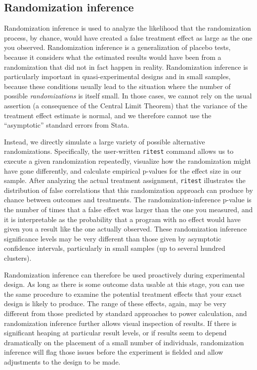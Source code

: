 \subsection{Randomization inference}

Randomization inference is used to analyze the likelihood
that the randomization process, by chance,
would have created a false treatment effect as large as the one you observed.
Randomization inference is a generalization of placebo tests,
because it considers what the estimated results would have been
from a randomization that did not in fact happen in reality.
Randomization inference is particularly important
in quasi-experimental designs and in small samples,
because these conditions usually lead to the situation
where the number of possible \textit{randomizations} is itself small.
In those cases, we cannot rely on the usual assertion
(a consequence of the Central Limit Theorem)
that the variance of the treatment effect estimate is normal,
and we therefore cannot use the ``asymptotic'' standard errors from Stata.

Instead, we directly simulate a large variety of possible alternative randomizations.
Specifically, the user-written \texttt{ritest} command
allows us to execute a given randomization repeatedly,
visualize how the randomization might have gone differently,
and calculate empirical p-values for the effect size in our sample.
After analyzing the actual treatment assignment,
\texttt{ritest} illustrates the distribution of false correlations
that this randomization approach can produce by chance
between outcomes and treatments.
The randomization-inference p-value is the number of times
that a false effect was larger than the one you measured,
and it is interpretable as the probability that a program with no effect
would have given you a result like the one actually observed.
These randomization inference
significance levels may be very different
than those given by asymptotic confidence intervals,
particularly in small samples (up to several hundred clusters).

Randomization inference can therefore be used proactively during experimental design.
As long as there is some outcome data usable at this stage,
you can use the same procedure to examine the potential treatment effects
that your exact design is likely to produce.
The range of these effects, again, may be very different
from those predicted by standard approaches to power calculation,
and randomization inference further allows visual inspection of results.
If there is significant heaping at particular result levels,
or if results seem to depend dramatically on the placement of a small number of individuals,
randomization inference will flag those issues before the experiment is fielded
and allow adjustments to the design to be made.

